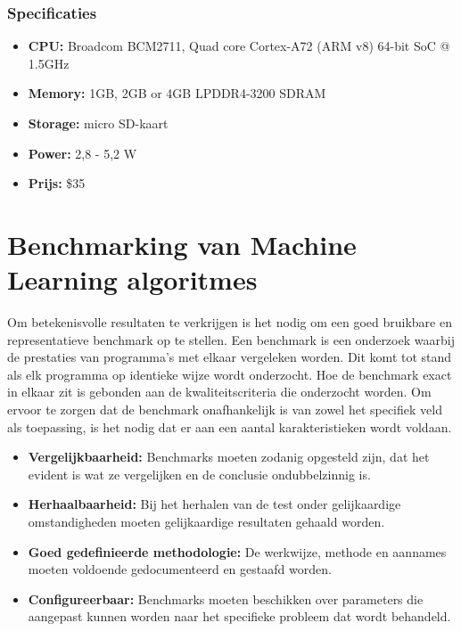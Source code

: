 		\subsubsection{Specificaties}
		\begin{itemize}
			\item \textbf{CPU:} Broadcom BCM2711, Quad core Cortex-A72 (ARM v8) 64-bit SoC @ 1.5GHz
			\item \textbf{Memory:} 1GB, 2GB or 4GB LPDDR4-3200 SDRAM
			\item \textbf{Storage:}  micro SD-kaart
			\item \textbf{Power:} 2,8 - 5,2 W
			\item \textbf{Prijs:} \$35
		\end{itemize}	
	
\newpage

\section{Benchmarking van Machine Learning algoritmes}
\label{benchmark}

Om betekenisvolle resultaten te verkrijgen is het nodig om een goed bruikbare en representatieve benchmark op te stellen. Een benchmark is een onderzoek waarbij de prestaties van programma's met elkaar vergeleken worden. Dit komt tot stand als elk programma op identieke wijze wordt onderzocht. Hoe de benchmark exact in elkaar zit is gebonden aan de kwaliteitscriteria die onderzocht worden. Om ervoor te zorgen dat de benchmark onafhankelijk is van zowel het specifiek veld als toepassing, is het nodig dat er aan een aantal karakteristieken wordt voldaan\cite{libuttibenchmarking}.

\begin{itemize}
	\item \textbf{Vergelijkbaarheid:} Benchmarks moeten zodanig opgesteld zijn, dat het evident is wat ze vergelijken en de conclusie ondubbelzinnig is.
	\item \textbf{Herhaalbaarheid:} Bij het herhalen van de test onder gelijkaardige omstandigheden moeten gelijkaardige resultaten gehaald worden.
	\item \textbf{Goed gedefinieerde methodologie:} De werkwijze, methode en aannames moeten voldoende gedocumenteerd en gestaafd worden.
	\item \textbf{Configureerbaar:} Benchmarks moeten beschikken over parameters die aangepast kunnen worden naar het specifieke probleem dat wordt behandeld.
\end{itemize}



